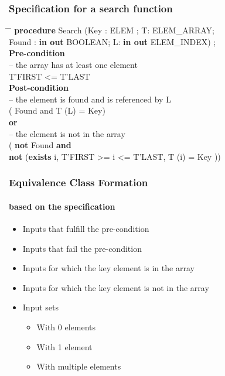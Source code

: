 
\begin{frame}
\frametitle{Specification for a search function}
\begin{tabbing}
\hspace*{2em} \= \hspace{2em} \= \kill
\textbf{procedure} Search (Key : ELEM ; T: ELEM\_ARRAY;\\
\> Found : \textbf{in out} BOOLEAN; L: \textbf{in out} ELEM\_INDEX) ;\\[1 em]
\textbf{Pre-condition}\\
\> \> -- the array has at least one element\\
\> \> T'FIRST <= T'LAST\\
\textbf{Post-condition}\\
\> \> -- the element is found and is referenced by L\\
\> \> ( Found and T (L) = Key) \\
\> \> \textbf{or}\\
\> \> -- the element is not in the array\\
\> \> ( \textbf{not} Found \textbf{and} \\
\> \> \textbf{not} (\textbf{exists} i, T'FIRST >= i <= T'LAST, T (i) = Key ))
\end{tabbing}
\end{frame}


\begin{frame}
\frametitle{Equivalence Class Formation}
\framesubtitle{based on the specification}
\begin{itemize}
  \item Inputs that fulfill the pre-condition 
  \item Inputs that fail the pre-condition
  \item Inputs for which the key element is in the array
  \item Inputs for which the key element is not in the array
  \item Input sets
    \begin{itemize}
      \item With 0 elements
      \item With 1 element
      \item With multiple elements
    \end{itemize}
\end{itemize}
\end{frame}

